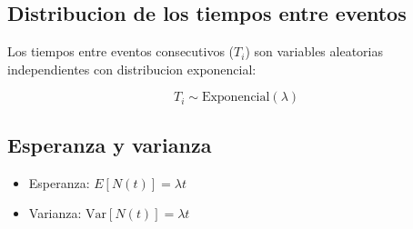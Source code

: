 \documentclass{article}
\begin{document}
\subsection*{Distribucion de los tiempos entre eventos}

Los tiempos entre eventos consecutivos ($T_i$) son variables aleatorias independientes con distribucion exponencial:

\[
T_i \sim \text{Exponencial}(\lambda)
\]

\subsection*{Esperanza y varianza}

\begin{itemize}
  \item Esperanza: $E[N(t)] = \lambda t$
  \item Varianza: $\text{Var}[N(t)] = \lambda t$
\end{itemize}
\end{document}
